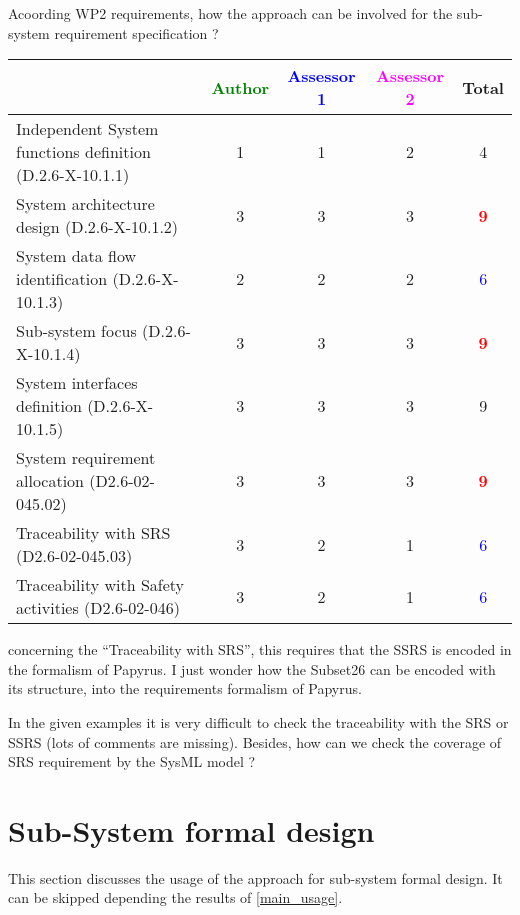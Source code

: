 Acoording WP2 requirements, how the approach can be involved for the sub-system requirement specification ?

\begin{tabular}{|l | c | c | c | c|}
\hline
& \textcolor{green}{Author} & \textcolor{blue}{Assessor 1} & \textcolor{magenta}{Assessor 2} & Total \\
\hline
Independent System functions definition (D.2.6-X-10.1.1) & 1     & 1     & 2     & 4     \\
\hline
System architecture design (D.2.6-X-10.1.2) & 3     & 3     & 3      & \textcolor{red}{\textbf{9}} \\
\hline
System data flow identification (D.2.6-X-10.1.3) & 2     & 2     & 2     & \textcolor{blue}{6} \\
\hline
Sub-system focus (D.2.6-X-10.1.4) & 3     & 3     & 3     & \textcolor{red}{\textbf{9}} \\
\hline
System interfaces definition (D.2.6-X-10.1.5) & 3     & 3     & 3     &  9\\
\hline
System requirement allocation (D2.6-02-045.02) & 3     & 3     & 3     & \textcolor{red}{\textbf{9}} \\
\hline
Traceability with SRS (D2.6-02-045.03) & 3     & 2     & 1     & \textcolor{blue}{6} \\
\hline
Traceability with Safety activities (D2.6-02-046) & 3     & 2     & 1     & \textcolor{blue}{6} \\
\hline
\end{tabular}

\begin{assessor1}
concerning the "`Traceability with SRS"', this requires that the SSRS is encoded in the formalism of Papyrus. I just wonder how the Subset26 can be encoded with its structure, into the requirements formalism of Papyrus. 
\end{assessor1}


\begin{assessor2}
In the given examples it is very difficult to check the traceability with the SRS or SSRS (lots of comments are missing). Besides, how can we check the coverage of SRS requirement by the SysML model ?
\end{assessor2}



\section{Sub-System formal design}
This section discusses the usage of the approach for sub-system formal design.
It can be skipped depending the results of \ref{main_usage}.

